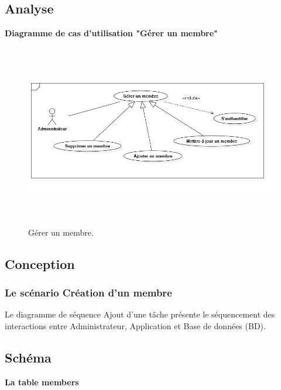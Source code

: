 

\subsection{Analyse}

    \textbf{ Diagramme de cas d'utilisation "G\'{e}rer un membre"}
    \begin{figure}[H]
    \center
    \includegraphics[width=13cm,height=8cm]{./figures/ucM.png}
    \caption{G\'{e}rer un membre.}

    \end{figure}

\subsection{Conception}
\subsubsection{Le sc\'{e}nario \guillemotleft{} Cr\'{e}ation d'un membre \guillemotright{}}

Le diagramme de s\'{e}quence \guillemotleft{} Ajout d'une t\^{a}che \guillemotright{} pr\'{e}sente le s\'{e}quencement
des interactions entre Administrateur, Application et Base de donn\'{e}es (BD).


\subsection{Sch\'{e}ma}

\textbf{La table \guillemotleft{} members \guillemotright{}}

